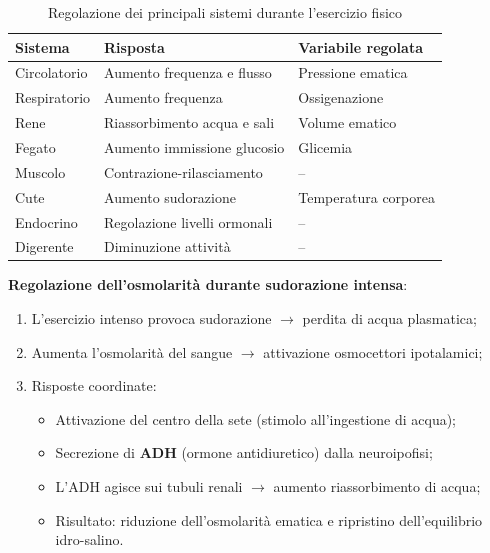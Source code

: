 \documentclass[11pt,a4paper,italian,twoside]{report}
\theoremstyle{definition} %
\begin{document}
\begin{table}[htbp]
  \centering
  \caption{Regolazione dei principali sistemi durante l'esercizio fisico}
  \label{tab:sistemi_esercizio}
  \begin{tabularx}{\textwidth}{l l l}
    \toprule
    \textbf{Sistema} & \textbf{Risposta} & \textbf{Variabile regolata} \\
    \midrule
    Circolatorio & Aumento frequenza e flusso & Pressione ematica \\
    Respiratorio & Aumento frequenza & Ossigenazione \\
    Rene & Riassorbimento acqua e sali & Volume ematico \\
    Fegato & Aumento immissione glucosio & Glicemia \\
    Muscolo & Contrazione-rilasciamento & -- \\
    Cute & Aumento sudorazione & Temperatura corporea \\
    Endocrino & Regolazione livelli ormonali & -- \\
    Digerente & Diminuzione attività & -- \\
    \bottomrule
  \end{tabularx}
\end{table}

\begin{esempio}
\textbf{Regolazione dell'osmolarità durante sudorazione intensa}:
\begin{enumerate}
  \item L'esercizio intenso provoca sudorazione $\rightarrow$ perdita di acqua plasmatica;
  \item Aumenta l'osmolarità del sangue $\rightarrow$ attivazione osmocettori ipotalamici;
  \item Risposte coordinate:
  \begin{itemize}
    \item Attivazione del centro della sete (stimolo all'ingestione di acqua);
    \item Secrezione di \textbf{ADH} (ormone antidiuretico) dalla neuroipofisi;
    \item L'ADH agisce sui tubuli renali $\rightarrow$ aumento riassorbimento di acqua;
    \item Risultato: riduzione dell'osmolarità ematica e ripristino dell'equilibrio idro-salino.
  \end{itemize}
\end{enumerate}
\end{esempio}
\end{document}
